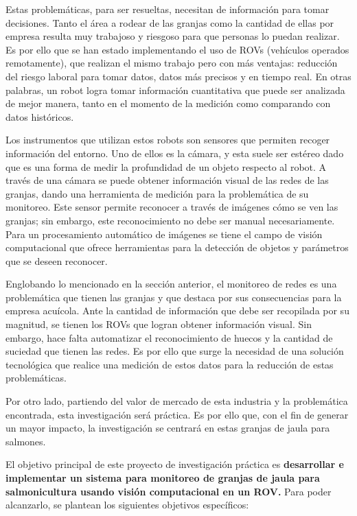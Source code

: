Estas problemáticas, para ser resueltas, necesitan de información para tomar decisiones. Tanto el área a rodear de las granjas como la cantidad de ellas por empresa resulta muy trabajoso y riesgoso para que personas lo puedan realizar. Es por ello que se han estado implementando el uso de ROVs (vehículos operados remotamente), que realizan el mismo trabajo pero con más ventajas: reducción del riesgo laboral para tomar datos, datos más precisos y en tiempo real. En otras palabras, un robot logra tomar información cuantitativa que puede ser analizada de mejor manera, tanto en el momento de la medición como comparando con datos históricos.

Los instrumentos que utilizan estos robots son sensores que permiten recoger información del entorno. Uno de ellos es la cámara, y esta suele ser estéreo dado que es una forma de medir la profundidad de un objeto respecto al robot. A través de una cámara se puede obtener información visual de las redes de las granjas, dando una herramienta de medición para la problemática de su monitoreo. Este sensor permite reconocer a través de imágenes cómo se ven las granjas; sin embargo, este reconocimiento no debe ser manual necesariamente. Para un procesamiento automático de imágenes se tiene el campo de visión computacional que ofrece herramientas para la detección de objetos y parámetros que se deseen reconocer. 


Englobando lo mencionado en la sección anterior, el monitoreo de redes es una problemática que tienen las granjas y que destaca por sus consecuencias para la empresa acuícola. Ante la cantidad de información que debe ser recopilada por su magnitud, se tienen los ROVs que logran obtener información visual. Sin embargo, hace falta automatizar el reconocimiento de huecos y la cantidad de suciedad que tienen las redes. Es por ello que surge la necesidad de una solución tecnológica que realice una medición de estos datos para la reducción de estas problemáticas.

Por otro lado, partiendo del valor de mercado de esta industria y la problemática encontrada, esta investigación será práctica. Es por ello que, con el fin de generar un mayor impacto, la investigación se centrará en estas granjas de jaula para salmones.  


El objetivo principal de este proyecto de investigación práctica es \textbf{desarrollar e implementar un sistema para monitoreo de granjas de jaula para salmonicultura usando visión computacional en un ROV.} Para poder alcanzarlo, se plantean los siguientes objetivos específicos:


